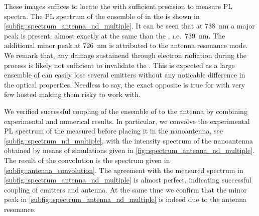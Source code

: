 			These images suffices to locate the \nd with sufficient precision to measure PL spectra.
			The PL spectrum of the ensemble of \sivs in the \nd is shown in \autoref{subfig::spectrum_antenna_nd_multiple}. It can be seen that at \SI{738}{\nm} a major peak is present, almost exactly at the same \wl than the \siv \zpl, \i.e.\ \SI{739}{\nm}. The additional minor peak at \SI{726}{\nm} is attributed to the antenna resonance mode. We remark that, any damage sustainend through electron radiation during the \pp process is likely not sufficient to invalidate the \nd. This is expected as a large ensemble of \sivs can easily lose several emitters without any noticable difference in the optical properties. Needless to say, the exact opposite is true for \nds with very few hosted \sivs making them risky to work with.

			We verified successful coupling of the ensemble of \sivs to the antenna by combining experimental and numerical results. In particular, we convolve the experimental PL spectrum of the \nd measured before placing it in the nanoantenna, see \autoref{subfig::spectrum_nd_multiple},  with the intensity spectrum of the nanoantenna obtained by means of simulations given in \autoref{fig::spectrum_antenna_nd_multiple}.
			The result of the convolution is the spectrum given in \autoref{subfig::antenna_convolution}. The agreement with the measured spectrum in \autoref{subfig::spectrum_antenna_nd_multiple} is almost perfect, indicating successful coupling of emitters and antenna. At the same time we confirm that the minor peak in \autoref{subfig::spectrum_antenna_nd_multiple} is indeed due to the antenna resonance.

